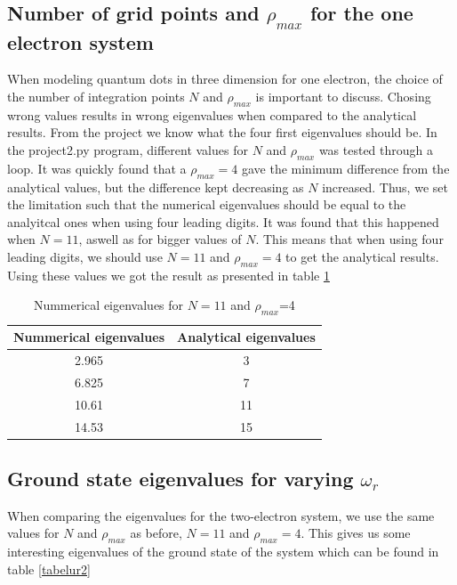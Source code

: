 \documentclass{article}
\begin{document}
\subsection{Number of grid points and $\rho_{max}$ for the one electron system}

When modeling quantum dots in three dimension for one electron, the choice of the number of integration points $N$ and $\rho_{max}$ is important to discuss. Chosing wrong values results in wrong eigenvalues when compared to the analytical results. From the project we know what the four first eigenvalues should be. In the project2.py program, different values for $N$ and $\rho_{max}$ was tested through a loop.
It was quickly found that a $\rho_{max}=4$ gave the minimum difference from the analytical values, but the difference kept decreasing as $N$ increased. Thus, we set the limitation such that the numerical eigenvalues should be equal to the analyitcal ones when using four leading digits. It was found that this happened when $N=11$, aswell as for bigger values of $N$. This means that when using four leading digits, we should use $N=11$ and $\rho_{max}=4$ to get the analytical results. Using these values we got the result as presented in table \ref{tabelur1}

\begin{table}[H]
    \centering
    \begin{tabular}{|c|c|}
    \hline
     Nummerical eigenvalues & Analytical eigenvalues\\
     \hline
      2.965  &  3\\
      6.825  &  7\\
      10.61  &  11\\
      14.53  &  15\\
     \hline
    \end{tabular}
    \caption{Nummerical eigenvalues for $N=11$ and $\rho_{max}$=4}
    \label{tabelur1}
\end{table}

\subsection{Ground state eigenvalues for varying $\omega_r$}

When comparing the eigenvalues for the two-electron system, we use the same values for $N$ and $\rho_{max}$ as before, $N=11$ and $\rho_{max}=4$. This gives us some interesting eigenvalues of the ground state of the system which can be found in table \ref{tabelur2}
\end{document}
